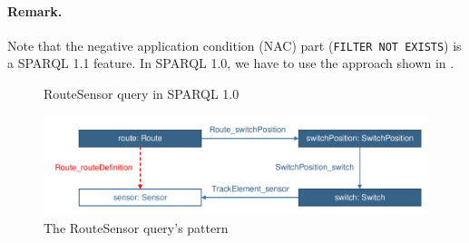 \paragraph{Remark.} Note that the negative application condition (NAC) part (\texttt{FILTER NOT EXISTS}) is a SPARQL 1.1 feature. In SPARQL 1.0, we have to use the approach shown in .

\begin{figure}[Htb]
\centering
\begin{minipage}{0.5\textwidth}
  { \alignListing
    }
  \caption{RouteSensor query in SPARQL 1.0}
  \label{lst:routesensor-sparql-nac10}
\end{minipage}
\end{figure}

% 
% 
% 

\begin{figure}[Htb]
		\centering
		\includegraphics[scale=0.4]{figures/trainbenchmark-routesensor}
		\caption{The RouteSensor query's pattern}
		\label{fig:trainbenchmark-routesensor}
\end{figure}

